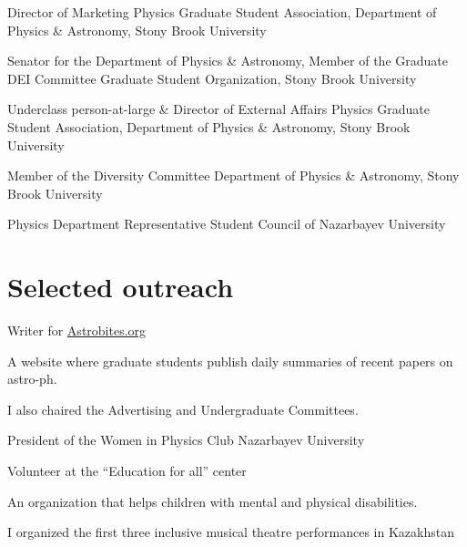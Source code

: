\documentclass[10pt]{article} %
\begin{document}
\begin{paracol}{1}


	
	{Director of Marketing}
	{Physics Graduate Student Association, Department of Physics \& Astronomy, Stony Brook University}

	{Senator for the Department of Physics \& Astronomy, Member of the Graduate DEI Committee}
	{Graduate Student Organization, Stony Brook University}
	
	{Underclass person-at-large \& Director of External Affairs}
	{Physics Graduate Student Association, Department of Physics \& Astronomy, Stony Brook University}
	
	{Member of the Diversity Committee}
	{Department of Physics \& Astronomy, Stony Brook University}
	
	{Physics Department Representative}
	{Student Council of Nazarbayev University}
	
\section{Selected outreach}
	{Writer for \href{https://astrobites.org/author/ssagynbayeva/}{Astrobites.org}}
	{A website where graduate students publish daily summaries of recent papers on astro-ph.
	
	I also chaired the Advertising and Undergraduate Committees.}

	
	
	
	{President of the Women in Physics Club}
	{Nazarbayev University}
	

	{Volunteer at the “Education for all” center}
	{An organization that helps children with mental and physical disabilities. 
	
	I organized the first three inclusive musical theatre performances in Kazakhstan}
	

\end{paracol}
\end{document}
